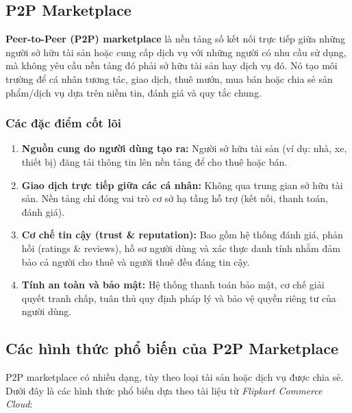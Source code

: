 \subsection{P2P Marketplace}

\textbf{Peer-to-Peer (P2P) marketplace} là nền tảng số kết nối trực tiếp giữa những người sở hữu tài sản hoặc cung cấp dịch vụ với những người có nhu cầu sử dụng, mà không yêu cầu nền tảng đó phải sở hữu tài sản hay dịch vụ đó. 
Nó tạo môi trường để cá nhân tương tác, giao dịch, thuê mướn, mua bán hoặc chia sẻ sản phẩm/dịch vụ dựa trên niềm tin, đánh giá và quy tắc chung.

\subsubsection*{Các đặc điểm cốt lõi}

\begin{enumerate}[label=\arabic*.]
    \item \textbf{Nguồn cung do người dùng tạo ra:} Người sở hữu tài sản (ví dụ: nhà, xe, thiết bị) đăng tải thông tin lên nền tảng để cho thuê hoặc bán.

    \item \textbf{Giao dịch trực tiếp giữa các cá nhân:} Không qua trung gian sở hữu tài sản. 
    Nền tảng chỉ đóng vai trò cơ sở hạ tầng hỗ trợ (kết nối, thanh toán, đánh giá).

    \item \textbf{Cơ chế tin cậy (trust \& reputation):} 
    Bao gồm hệ thống đánh giá, phản hồi (ratings \& reviews), hồ sơ người dùng và xác thực danh tính nhằm đảm bảo cả người cho thuê và người thuê đều đáng tin cậy.

    \item \textbf{Tính an toàn và bảo mật:} 
    Hệ thống thanh toán bảo mật, cơ chế giải quyết tranh chấp, tuân thủ quy định pháp lý và bảo vệ quyền riêng tư của người dùng.
\end{enumerate}

\subsection{Các hình thức phổ biến của P2P Marketplace}

P2P marketplace có nhiều dạng, tùy theo loại tài sản hoặc dịch vụ được chia sẻ. 
Dưới đây là các hình thức phổ biến dựa theo tài liệu từ \textit{Flipkart Commerce Cloud}\cite{flipkartCCC2025}:

